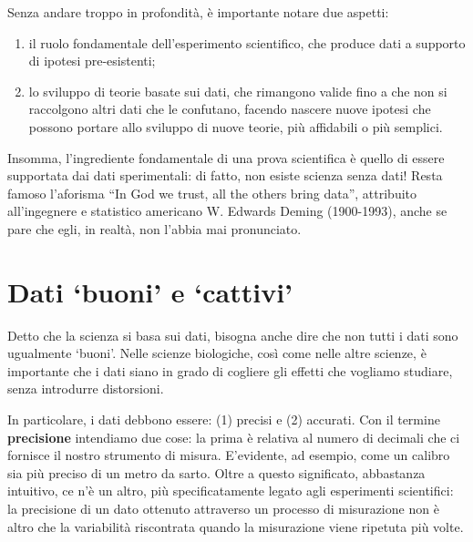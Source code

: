 \documentclass[a4paper,12pt,oneside]{book}
\providecommand{\tightlist}{%
  \setlength{\itemsep}{0pt}\setlength{\parskip}{0pt}}
\begin{document}
Senza andare troppo in profondità, è importante notare due aspetti:

\begin{enumerate}
\def\labelenumi{\arabic{enumi}.}
\tightlist
\item
  il ruolo fondamentale dell'esperimento scientifico, che produce dati a supporto di ipotesi pre-esistenti;
\item
  lo sviluppo di teorie basate sui dati, che rimangono valide fino a che non si raccolgono altri dati che le confutano, facendo nascere nuove ipotesi che possono portare allo sviluppo di nuove teorie, più affidabili o più semplici.
\end{enumerate}

Insomma, l'ingrediente fondamentale di una prova scientifica è quello di essere supportata dai dati sperimentali: di fatto, non esiste scienza senza dati! Resta famoso l'aforisma ``In God we trust, all the others bring data'', attribuito all'ingegnere e statistico americano W. Edwards Deming (1900-1993), anche se pare che egli, in realtà, non l'abbia mai pronunciato.

\hypertarget{dati-buoni-e-cattivi}{%
\section{Dati `buoni' e `cattivi'}\label{dati-buoni-e-cattivi}}

Detto che la scienza si basa sui dati, bisogna anche dire che non tutti i dati sono ugualmente `buoni'. Nelle scienze biologiche, così come nelle altre scienze, è importante che i dati siano in grado di cogliere gli effetti che vogliamo studiare, senza introdurre distorsioni.

In particolare, i dati debbono essere: (1) precisi e (2) accurati. Con il termine \textbf{precisione} intendiamo due cose: la prima è relativa al numero di decimali che ci fornisce il nostro strumento di misura. E'evidente, ad esempio, come un calibro sia più preciso di un metro da sarto. Oltre a questo significato, abbastanza intuitivo, ce n'è un altro, più specificatamente legato agli esperimenti scientifici: la precisione di un dato ottenuto attraverso un processo di misurazione non è altro che la variabilità riscontrata quando la misurazione viene ripetuta più volte.
\end{document}
